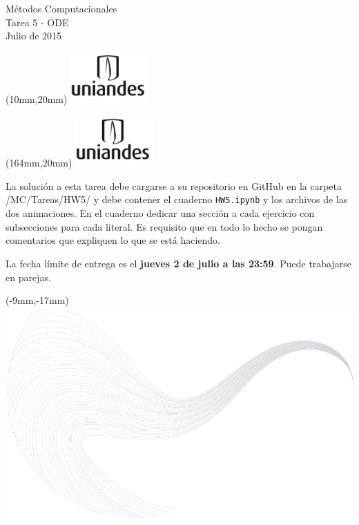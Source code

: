 \documentclass[11pt,letterpaper]{exam}
\begin{document}
\begin{center}
{\Large Métodos Computacionales} \\
Tarea 5 - \textsc{ODE} \\
Julio de 2015
\end{center}

\begin{textblock*}{40mm}(10mm,20mm)
  \includegraphics[width=3cm]{logoUniandes.png}
\end{textblock*}

\begin{textblock*}{40mm}(164mm,20mm)
  \includegraphics[width=3cm]{logoUniandes.png}
\end{textblock*}

\vspace{0.5cm}

La solución a esta tarea debe cargarse a su repositorio en GitHub en la carpeta /MC/Tareas/HW5/ y debe contener el cuaderno \verb+HW5.ipynb+ y los archivos de las dos animaciones. En el cuaderno dedicar una sección a cada ejercicio con subsecciones para cada literal. Es requisito que en todo lo hecho se pongan comentarios que expliquen lo que se está haciendo.  

La fecha límite de entrega es el \textbf{jueves 2 de julio a las 23:59}. Puede trabajarse en parejas.


\begin{textblock*}{100mm}(-9mm,-17mm)
  \includegraphics[width=22cm]{tangle2.pdf}
\end{textblock*}
\end{document}
